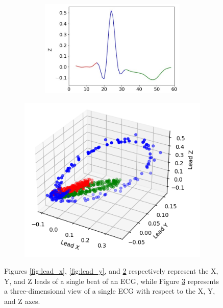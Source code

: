 \documentclass[12pt,english]{report}
\begin{document}
\begin{figure}[H]
\begin{subfigure}{0.4\textwidth}
\begin{subfigure}{\textwidth}
            \includegraphics[width=1\textwidth]{images/lead_z.png}
            \caption{}
            \label{fig:lead_z}
        \end{subfigure}
    \end{subfigure}
    \begin{subfigure}{0.55\textwidth}
        \centering
        \includegraphics[width=1\linewidth]{images/frank_3d.png}
        \captionsetup{justification=centering}
        \caption{}
        \label{fig:frank_3d}
    \end{subfigure}
    \captionsetup{justification=centering}
    \caption{Figures \ref{fig:lead_x}, \ref{fig:lead_y}, and \ref{fig:lead_z} respectively represent the X, Y, and Z leads of a single beat of an ECG, while Figure \ref{fig:frank_3d} represents a three-dimensional view of a single ECG with respect to the X, Y, and Z axes.}
    \label{fig:ecg}
\end{figure}
\end{document}
